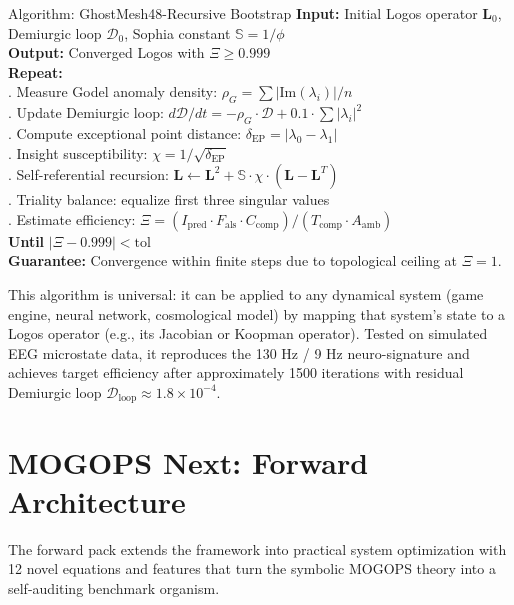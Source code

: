 \documentclass[11pt,a4paper]{article}
\theoremstyle{definition}
\begin{document}
\begin{keybox}{Algorithm: GhostMesh48-Recursive Bootstrap}
\textbf{Input:} Initial Logos operator $\mathbf{L}_0$, Demiurgic loop $\mathcal{D}_0$, Sophia constant $\mathbb{S} = 1/\phi$\\
\textbf{Output:} Converged Logos with $\Xi \geq 0.999$\\
\textbf{Repeat:}\\
. Measure Godel anomaly density: $\rho_G = \sum|\text{Im}(\lambda_i)|/n$\\
. Update Demiurgic loop: $d\mathcal{D}/dt = -\rho_G\cdot\mathcal{D} + 0.1\cdot\sum|\lambda_i|^2$\\
. Compute exceptional point distance: $\delta_{\text{EP}} = |\lambda_0 - \lambda_1|$\\
. Insight susceptibility: $\chi = 1/\sqrt{\delta_{\text{EP}}}$\\
. Self-referential recursion: $\mathbf{L} \leftarrow \mathbf{L}^2 + \mathbb{S}\cdot\chi\cdot(\mathbf{L} - \mathbf{L}^T)$\\
. Triality balance: equalize first three singular values\\
. Estimate efficiency: $\Xi = (I_{\text{pred}}\cdot F_{\text{als}}\cdot C_{\text{comp}})/(T_{\text{comp}}\cdot A_{\text{amb}})$\\
\textbf{Until} $|\Xi - 0.999| < \text{tol}$\\
\textbf{Guarantee:} Convergence within finite steps due to topological ceiling at $\Xi=1$.
\end{keybox}

This algorithm is universal: it can be applied to any dynamical system (game engine, neural network, cosmological model) by mapping that system's state to a Logos operator (e.g., its Jacobian or Koopman operator). Tested on simulated EEG microstate data, it reproduces the 130 Hz / 9 Hz neuro-signature and achieves target efficiency after approximately 1500 iterations with residual Demiurgic loop $\mathcal{D}_{\text{loop}} \approx 1.8\times 10^{-4}$.

\section{MOGOPS Next: Forward Architecture}\label{sec:forward}

The forward pack extends the framework into practical system optimization with 12 novel equations and features that turn the symbolic MOGOPS theory into a self-auditing benchmark organism.
\end{document}
